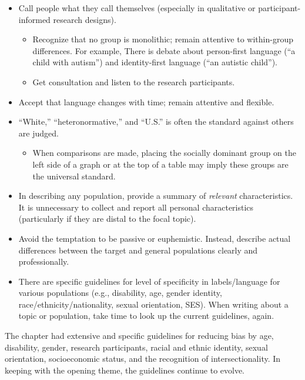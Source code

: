 \documentclass[
  11pt,
]{book}
\providecommand{\tightlist}{%
  \setlength{\itemsep}{0pt}\setlength{\parskip}{0pt}}
\begin{document}
\begin{itemize}
\tightlist
\item
  Call people what they call themselves (especially in qualitative or participant-informed research designs).

  \begin{itemize}
  \tightlist
  \item
    Recognize that no group is monolithic; remain attentive to within-group differences. For example, There is debate about person-first language (``a child with autism'') and identity-first language (``an autistic child'').
  \item
    Get consultation and listen to the research participants.
  \end{itemize}
\item
  Accept that language changes with time; remain attentive and flexible.
\item
  ``White,'' ``heteronormative,'' and ``U.S.'' is often the standard against others are judged.

  \begin{itemize}
  \tightlist
  \item
    When comparisons are made, placing the socially dominant group on the left side of a graph or at the top of a table may imply these groups are the universal standard.
  \end{itemize}
\item
  In describing any population, provide a summary of \emph{relevant} characteristics. It is unnecessary to collect and report all personal characteristics (particularly if they are distal to the focal topic).
\item
  Avoid the temptation to be passive or euphemistic. Instead, describe actual differences between the target and general populations clearly and professionally.
\item
  There are specific guidelines for level of specificity in labels/language for various populations (e.g., disability, age, gender identity, race/ethnicity/nationality, sexual orientation, SES). When writing about a topic or population, take time to look up the current guidelines, again.
\end{itemize}

The chapter had extensive and specific guidelines for reducing bias by age, disability, gender, research participants, racial and ethnic identity, sexual orientation, socioeconomic status, and the recognition of intersectionality. In keeping with the opening theme, the guidelines continue to evolve.
\end{document}
